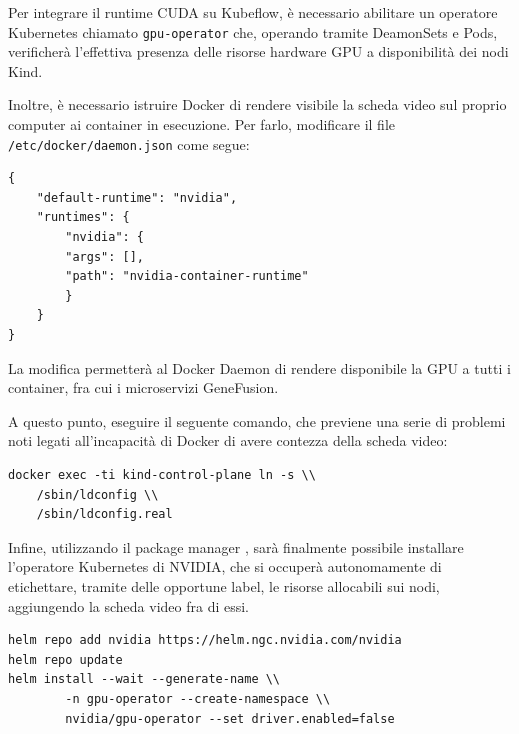 Per integrare il runtime CUDA su Kubeflow, è necessario abilitare un operatore Kubernetes chiamato {\small \verb|gpu-operator|} che, operando tramite DeamonSets e Pods, verificherà l'effettiva presenza delle risorse hardware GPU a disponibilità dei nodi Kind.

Inoltre, è necessario istruire Docker di rendere visibile la scheda video sul proprio computer ai container in esecuzione. Per farlo, modificare il file {\small \verb|/etc/docker/daemon.json|} come segue:

\begin{code}
\label{code:apx:a:json}
\begin{verbatim}
{
    "default-runtime": "nvidia",
    "runtimes": {
        "nvidia": {
        "args": [],
        "path": "nvidia-container-runtime"
        }
    }
}
\end{verbatim}
\end{code}

La modifica permetterà al Docker Daemon di rendere disponibile la GPU a tutti i container, fra cui i microservizi GeneFusion.

A questo punto, eseguire il seguente comando, che previene una serie di problemi noti legati all'incapacità di Docker di avere contezza della scheda video:

\begin{small}
\begin{Verbatim}[commandchars=\\\{\}]
docker exec -ti kind-control-plane ln -s \\
    /sbin/ldconfig \\
    /sbin/ldconfig.real
\end{Verbatim}
\end{small}

Infine, utilizzando il package manager , sarà finalmente possibile installare l'operatore Kubernetes di NVIDIA, che si occuperà autonomamente di etichettare, tramite delle opportune label, le risorse allocabili sui nodi, aggiungendo la scheda video fra di essi.

\begin{small}
\begin{Verbatim}[commandchars=\\\{\}]
helm repo add nvidia https://helm.ngc.nvidia.com/nvidia
helm repo update
helm install --wait --generate-name \\
        -n gpu-operator --create-namespace \\
        nvidia/gpu-operator --set driver.enabled=false
\end{Verbatim}
\end{small}

